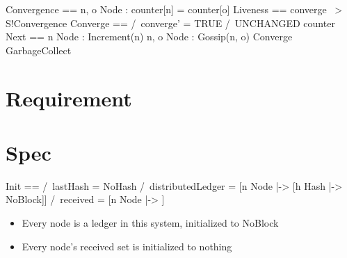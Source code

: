 \documentclass{report}
\begin{document}
\begin{tla}
Convergence == \A n, o \in Node : counter[n] = counter[o]
Liveness == converge ~> S!Convergence
Converge ==
    /\ converge' = TRUE
    /\ UNCHANGED counter  
Next ==
  \/ \E n \in Node : Increment(n)
  \/ \E n, o \in Node : Gossip(n, o)
  \/ Converge
  \/ GarbageCollect
\end{tla}
\begin{tlatex}
%
%
%
%
%
%
%
\end{tlatex}







\section{Requirement}

\section{Spec}

\begin{tla}
Init ==
    /\ lastHash = NoHash
    /\ distributedLedger = [n \in Node |-> [h \in Hash |-> NoBlock]]
    /\ received = [n \in Node |-> {}]
\end{tla}
\begin{tlatex}
%
%
%
\end{tlatex}
\newline

\begin{itemize}
    \item Every node is a ledger in this system, initialized to NoBlock
    \item Every node's received set is initialized to nothing
\end{itemize}
\end{document}
